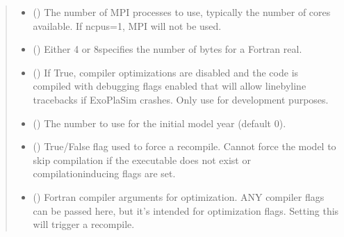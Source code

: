 \documentclass[letterpaper,10pt,english]{sphinxmanual}
\begin{document}
\begin{fulllineitems}
\begin{quote}
\begin{description}
\begin{itemize}
\item {} 
 (\sphinxstyleliteralemphasis{\sphinxupquote{, }}) \textendash{} The number of MPI processes to use, typically the number of cores
available. If ncpus=1, MPI will not be used.

\item {} 
 (\sphinxstyleliteralemphasis{\sphinxupquote{, }}) \textendash{} Either 4 or 8\textendash{}specifies the number of bytes for a Fortran real.

\item {} 
 (\sphinxstyleliteralemphasis{\sphinxupquote{, }}) \textendash{} If True, compiler optimizations are disabled
and the code is compiled with debugging flags enabled that will
allow line\sphinxhyphen{}by\sphinxhyphen{}line tracebacks if ExoPlaSim crashes. Only use for
development purposes.

\item {} 
 (\sphinxstyleliteralemphasis{\sphinxupquote{, }}) \textendash{} The number to use for the initial model year (default 0).

\item {} 
 (\sphinxstyleliteralemphasis{\sphinxupquote{, }}) \textendash{} True/False flag used to force a recompile. Cannot force the
model to skip compilation if the executable does not exist or
compilation\sphinxhyphen{}inducing flags are set.

\item {} 
 (\sphinxstyleliteralemphasis{\sphinxupquote{, }}) \textendash{} Fortran compiler arguments for optimization. ANY compiler
flags can be passed here, but it’s intended for optimization
flags. Setting this will trigger a recompile.


\end{itemize}
\end{description}
\end{quote}
\end{fulllineitems}
\end{document}
